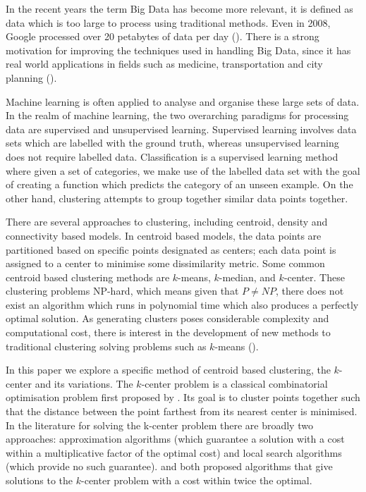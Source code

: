In the recent years the term Big Data has become more relevant, it is defined as data which is too large to process using traditional methods. Even in 2008, Google processed over 20 petabytes of data per day (\cite{dean_mapreduce_2008}). There is a strong motivation for improving the techniques used in handling Big Data, since it has real world applications in fields such as medicine, transportation and city planning (\cite{al_nuaimi_applications_2015,obermeyer_predicting_2016}). 

Machine learning is often applied to analyse and organise these large sets of data. In the realm of machine learning, the two overarching paradigms for processing data are supervised and unsupervised learning. Supervised learning involves data sets which are labelled with the ground truth, whereas unsupervised learning does not require labelled data. Classification is a supervised learning method where given a set of categories, we make use of the labelled data set with the goal of creating a function which predicts the category of an unseen example. On the other hand, clustering attempts to group together similar data points together. 

There are several approaches to clustering, including centroid, density and connectivity based models. In centroid based models, the data points are partitioned based on specific points designated as centers; each data point is assigned to a center to minimise some dissimilarity metric. Some common centroid based clustering methods are $k$-means, $k$-median, and $k$-center. These clustering problems NP-hard, which means given that $P\neq NP$, there does not exist an algorithm which runs in polynomial time which also produces a perfectly optimal solution. As generating clusters poses considerable complexity and computational cost, there is interest in the development of new methods to traditional clustering solving problems such as $k$-means (\cite{zhao_parallel_1970}). 

In this paper we explore a specific method of centroid based clustering, the $k$-center and its variations. The $k$-center problem is a classical combinatorial optimisation problem first proposed by \textcite{hakimi_optimum_1964}. Its goal is to cluster points together such that the distance between the point farthest from its nearest center is minimised. In the literature for solving the k-center problem there are broadly two approaches: approximation algorithms (which guarantee a solution with a cost within a multiplicative factor of the optimal cost) and local search algorithms (which provide no such guarantee). \textcite{gonzalez_clustering_1985} and \textcite{hochbaum_best_1985} both proposed algorithms that give solutions to the $k$-center problem with a cost within twice the optimal.

